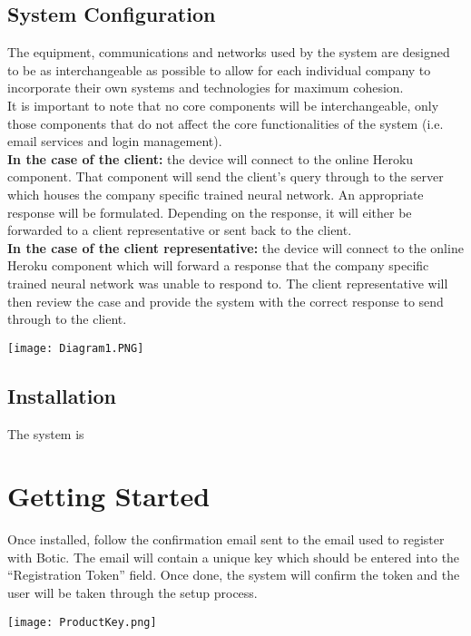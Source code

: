 \documentclass[11pt]{article}
\begin{document}
\subsection{System Configuration}
\begin{flushleft}
	The equipment, communications and networks used by the system are designed to be as interchangeable as possible to allow for each individual company to incorporate their own systems and technologies for maximum cohesion.\\[0.5cm]
	It is important to note that no core components will be interchangeable, only those components that do not affect the core functionalities of the system (i.e. email services and login management).\\[0.5cm]
	\textbf{In the case of the client:} the device will connect to the online Heroku component. That component will send the client's query through to the server which houses the company specific trained neural network. An appropriate response will be formulated. Depending on the response, it will either be forwarded to a client representative or sent back to the client.\\[0.5cm]
	\textbf{In the case of the client representative:} the device will connect to the online Heroku component which will forward a response that the company specific trained neural network was unable to respond to. The client representative will then review the case and provide the system with the correct response to send through to the client.\\[0.5cm]
\end{flushleft}
\texttt{[image: Diagram1.PNG]}

\subsection{Installation}
\begin{flushleft}
	The system is 
\end{flushleft}
\section {Getting Started}
\begin{flushleft}
	Once installed, follow the confirmation email sent to the email used to register with Botic. The email will contain a unique key which should be entered into the “Registration Token” field. Once done, the system will confirm the token and the user will be taken through the setup process.
\end{flushleft}
\texttt{[image: ProductKey.png]}
\end{document}
